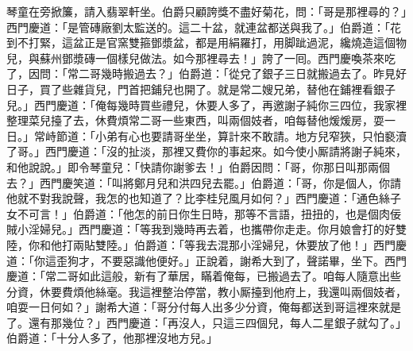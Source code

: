 琴童在旁掀簾，請入翡翠軒坐。伯爵只顧誇獎不盡好菊花，問：「哥是那裡尋的？」西門慶道：「是管磚廠劉太監送的。這二十盆，就連盆都送與我了。」伯爵道：「花到不打緊，這盆正是官窯雙箍鄧漿盆，{}都是用絹羅打，用脚跐過泥，纔燒造這個物兒，與蘇州鄧漿磚一個樣兒做法。如今那裡尋去！」誇了一囘。西門慶喚茶來吃了，因問：「常二哥幾時搬過去？」伯爵道：「從兌了銀子三日就搬過去了。昨見好日子，買了些雜貨兒，門首把鋪兒也開了。就是常二嫂兄弟，替他在鋪裡看銀子兒。」西門慶道：「俺每幾時買些禮兒，休要人多了，再邀謝子純你三四位，我家裡整理菜兒擡了去，休費煩常二哥一些東西，叫兩個妓者，咱每替他煖煖房，耍一日。」常峙節道：「小弟有心也要請哥坐坐，算計來不敢請。地方兒窄狹，只怕褻瀆了哥。」西門慶道：「沒的扯淡，那裡又費你的事起來。如今使小厮請將謝子純來，和他說說。」即令琴童兒：「快請你謝爹去！」伯爵因問：「哥，你那日叫那兩個去？」西門慶笑道：「叫將鄭月兒和洪四兒去罷。」伯爵道：「哥，你是個人，你請他就不對我說聲，我怎的也知道了？比李桂兒風月如何？」西門慶道：「通色絲子女不可言！」伯爵道：「他怎的前日你生日時，那等不言語，扭扭的，也是個肉佞賊小淫婦兒。」西門慶道：「等我到幾時再去着，也攜帶你走走。你月娘會打的好雙陸，你和他打兩貼雙陸。」伯爵道：「等我去混那小淫婦兒，休要放了他！」西門慶道：「你這歪狗才，不要惡識他便好。」正說着，謝希大到了，聲諾畢，坐下。西門慶道：「常二哥如此這般，新有了華居，瞞着俺每，已搬過去了。咱每人隨意出些分資，休要費煩他絲毫。我這裡整治停當，教小厮擡到他府上，我還叫兩個妓者，咱耍一日何如？」謝希大道：「哥分付每人出多少分資，俺每都送到哥這裡來就是了。還有那幾位？」西門慶道：「再沒人，只這三四個兒，每人二星銀子就勾了。」伯爵道：「十分人多了，他那裡沒地方兒。」

